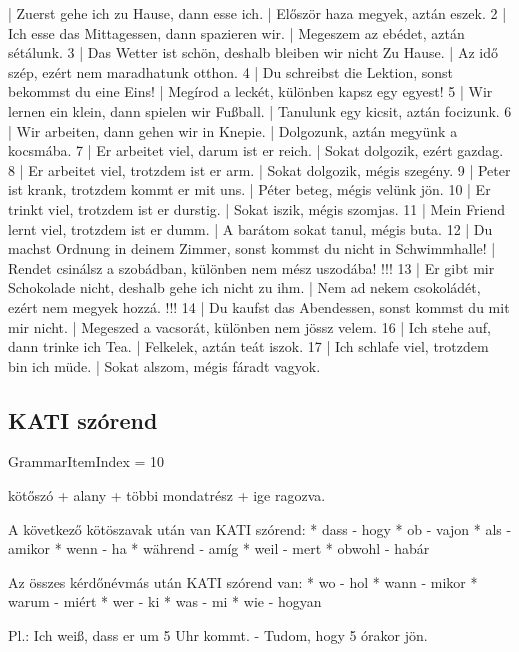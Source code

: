 \documentclass{article}
\newenvironment{desc}{\verbatim}{\endverbatim}
\newenvironment{exmp}{\verbatim}{\endverbatim}
\begin{document}
\begin{exmp}
1 | Zuerst gehe ich zu Hause, dann esse ich. | Először haza megyek, aztán eszek.
2 | Ich esse das Mittagessen, dann spazieren wir. | Megeszem az ebédet, aztán sétálunk.
3 | Das Wetter ist schön, deshalb bleiben wir nicht Zu Hause. | Az idő szép, ezért nem maradhatunk otthon.
4 | Du schreibst die Lektion, sonst bekommst du eine Eins! | Megírod a leckét, különben kapsz egy egyest!
5 | Wir lernen ein klein, dann spielen wir Fußball. | Tanulunk egy kicsit, aztán focizunk.
6 | Wir arbeiten, dann gehen wir in Knepie. | Dolgozunk, aztán megyünk a kocsmába.
7 | Er arbeitet viel, darum ist er reich. | Sokat dolgozik, ezért gazdag.
8 | Er arbeitet viel, trotzdem ist er arm. | Sokat dolgozik, mégis szegény.
9 | Peter ist krank, trotzdem kommt er mit uns. | Péter beteg, mégis velünk jön.
10 | Er trinkt viel, trotzdem ist er durstig. | Sokat iszik, mégis szomjas.
11 | Mein Friend lernt viel, trotzdem ist er dumm. | A barátom sokat tanul, mégis buta.
12 | Du machst Ordnung in deinem Zimmer, sonst kommst du nicht in Schwimmhalle! | Rendet csinálsz a szobádban, különben nem mész uszodába! !!!
13 | Er gibt mir Schokolade nicht, deshalb gehe ich nicht zu ihm. | Nem ad nekem csokoládét, ezért nem megyek hozzá. !!!
14 | Du kaufst das Abendessen, sonst kommst du mit mir nicht. | Megeszed a vacsorát, különben nem jössz velem.
16 | Ich stehe auf, dann trinke ich Tea. | Felkelek, aztán teát iszok.
17 | Ich schlafe viel, trotzdem bin ich müde. | Sokat alszom, mégis fáradt vagyok.
\end{exmp}

\subsection{KATI szórend}

GrammarItemIndex = 10

\begin{desc}
kötőszó + alany + többi mondatrész + ige ragozva.

A következő kötöszavak után van KATI szórend:
* dass - hogy
* ob - vajon
* als - amikor
* wenn - ha
* während - amíg
* weil - mert
* obwohl - habár

Az összes kérdőnévmás után KATI szórend van:
* wo - hol
* wann - mikor
* warum - miért
* wer - ki
* was - mi
* wie - hogyan

Pl.: Ich weiß, dass er um 5 Uhr kommt. - Tudom, hogy 5 órakor jön.
\end{desc}
\end{document}
